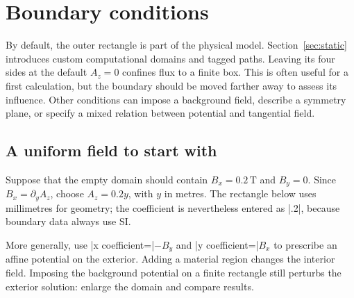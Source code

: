 \section{Boundary conditions}
\label{sec:boundaries}
By default, the outer rectangle is part of the physical model.
Section~\ref{sec:static} introduces custom computational domains and tagged paths. Leaving its four sides
at the default $A_z=0$ confines flux to a finite box. This is often useful
for a first calculation, but the boundary should be moved farther away
to assess its influence. Other conditions can impose a background field,
describe a symmetry plane, or specify a mixed relation between potential
and tangential field.

\subsection{A uniform field to start with}
Suppose that the empty domain should contain $B_x=0.2\,\mathrm T$ and
$B_y=0$. Since $B_x=\partial_y A_z$, choose $A_z=0.2y$, with $y$ in
metres. The rectangle below uses millimetres for geometry; the coefficient
is nevertheless entered as |.2|, because boundary data always use SI.

\begin{codeexample}[width=5cm]
\end{codeexample}

More generally, use |x coefficient=|$-B_y$ and
|y coefficient=|$B_x$ to prescribe an affine potential on the exterior.
Adding a material region changes the interior field. Imposing the
background potential on a finite rectangle still perturbs the exterior
solution: enlarge the domain and compare results.

